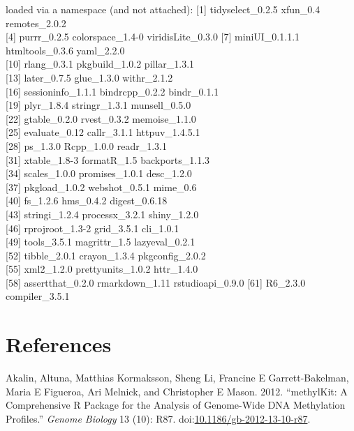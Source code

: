 \documentclass[onehalf,12pt]{beavtex}
\begin{document}
  loaded via a namespace (and not attached): {[}1{]} tidyselect\_0.2.5
  xfun\_0.4 remotes\_2.0.2\\
  {[}4{]} purrr\_0.2.5 colorspace\_1.4-0 viridisLite\_0.3.0 {[}7{]}
  miniUI\_0.1.1.1 htmltools\_0.3.6 yaml\_2.2.0\\
  {[}10{]} rlang\_0.3.1 pkgbuild\_1.0.2 pillar\_1.3.1\\
  {[}13{]} later\_0.7.5 glue\_1.3.0 withr\_2.1.2\\
  {[}16{]} sessioninfo\_1.1.1 bindrcpp\_0.2.2 bindr\_0.1.1\\
  {[}19{]} plyr\_1.8.4 stringr\_1.3.1 munsell\_0.5.0\\
  {[}22{]} gtable\_0.2.0 rvest\_0.3.2 memoise\_1.1.0\\
  {[}25{]} evaluate\_0.12 callr\_3.1.1 httpuv\_1.4.5.1\\
  {[}28{]} ps\_1.3.0 Rcpp\_1.0.0 readr\_1.3.1\\
  {[}31{]} xtable\_1.8-3 formatR\_1.5 backports\_1.1.3\\
  {[}34{]} scales\_1.0.0 promises\_1.0.1 desc\_1.2.0\\
  {[}37{]} pkgload\_1.0.2 webshot\_0.5.1 mime\_0.6\\
  {[}40{]} fs\_1.2.6 hms\_0.4.2 digest\_0.6.18\\
  {[}43{]} stringi\_1.2.4 processx\_3.2.1 shiny\_1.2.0\\
  {[}46{]} rprojroot\_1.3-2 grid\_3.5.1 cli\_1.0.1\\
  {[}49{]} tools\_3.5.1 magrittr\_1.5 lazyeval\_0.2.1\\
  {[}52{]} tibble\_2.0.1 crayon\_1.3.4 pkgconfig\_2.0.2\\
  {[}55{]} xml2\_1.2.0 prettyunits\_1.0.2 httr\_1.4.0\\
  {[}58{]} assertthat\_0.2.0 rmarkdown\_1.11 rstudioapi\_0.9.0 {[}61{]}
  R6\_2.3.0 compiler\_3.5.1
  
  \backmatter
  
  \chapter{References}\label{references}
  
  \noindent
  
  \setlength{\parindent}{-0.20in} \setlength{\leftskip}{0.20in}
  \setlength{\parskip}{8pt}
  
  \hypertarget{refs}{}
  \hypertarget{ref-AkalinmethylKitcomprehensivepackage2012}{}
  Akalin, Altuna, Matthias Kormaksson, Sheng Li, Francine E
  Garrett-Bakelman, Maria E Figueroa, Ari Melnick, and Christopher E
  Mason. 2012. ``methylKit: A Comprehensive R Package for the Analysis of
  Genome-Wide DNA Methylation Profiles.'' \emph{Genome Biology} 13 (10):
  R87.
  doi:\href{https://doi.org/10.1186/gb-2012-13-10-r87}{10.1186/gb-2012-13-10-r87}.
  
\end{document}
